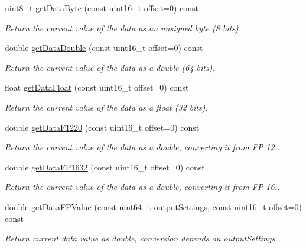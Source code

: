 \begin{DoxyCompactItemize}
\item 
uint8\-\_\-t \hyperlink{classxsens_1_1Message_a9cf39d36004d498ea6b0859391ed34b9}{get\-Data\-Byte} (const uint16\-\_\-t offset=0) const 
\begin{DoxyCompactList}\small\item\em \-Return the current value of the data as an unsigned byte (8 bits). \end{DoxyCompactList}\item 
double \hyperlink{classxsens_1_1Message_ab0e146aee27c98458e49bdd468ad9614}{get\-Data\-Double} (const uint16\-\_\-t offset=0) const 
\begin{DoxyCompactList}\small\item\em \-Return the current value of the data as a double (64 bits). \end{DoxyCompactList}\item 
float \hyperlink{classxsens_1_1Message_afe0397993529007ec9c660090f44c60f}{get\-Data\-Float} (const uint16\-\_\-t offset=0) const 
\begin{DoxyCompactList}\small\item\em \-Return the current value of the data as a float (32 bits). \end{DoxyCompactList}\item 
double \hyperlink{classxsens_1_1Message_ac303f7cfeebdd6d66e080dc35e851280}{get\-Data\-F1220} (const uint16\-\_\-t offset=0) const 
\begin{DoxyCompactList}\small\item\em \-Return the current value of the data as a double, converting it from \-F\-P 12.. \end{DoxyCompactList}\item 
double \hyperlink{classxsens_1_1Message_a3b9b827599e3b06c00a7fb955f1173ad}{get\-Data\-F\-P1632} (const uint16\-\_\-t offset=0) const 
\begin{DoxyCompactList}\small\item\em \-Return the current value of the data as a double, converting it from \-F\-P 16.. \end{DoxyCompactList}\item 
double \hyperlink{classxsens_1_1Message_a760ab51f0f64ac7139dbf7963ae92f61}{get\-Data\-F\-P\-Value} (const uint64\-\_\-t output\-Settings, const uint16\-\_\-t offset=0) const 
\begin{DoxyCompactList}\small\item\em \-Return current data value as double, conversion depends on output\-Settings. \end{DoxyCompactList}\item 

\end{DoxyCompactItemize}
